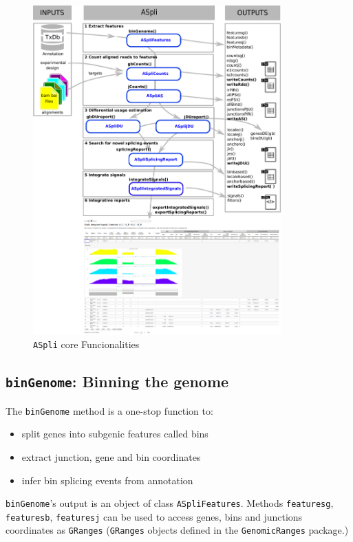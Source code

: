 \documentclass{article}
\begin{document}
\begin{figure}[ht!]
\centering
\includegraphics[width=0.85\textwidth]{images/fig1.pdf}
\caption{ \texttt{ASpli} core Funcionalities }
\label{fig:ASpliStructure}
\end{figure}

\subsection{\texttt{binGenome}: Binning the genome }
\label{sectionBinG}

The \texttt{binGenome} method is a one-stop function to:
\begin{itemize}
 \item split genes into subgenic features called bins
 \item extract junction, gene and bin coordinates
 \item infer bin splicing events from annotation 
\end{itemize}

\texttt{binGenome}'s output is an object of class \texttt{ASpliFeatures}. 
Methods \texttt{featuresg}, \texttt{featuresb}, \texttt{featuresj} can be used to access genes, bins and junctions coordinates as \texttt{GRanges} (\texttt{GRanges} objects defined in the \texttt{GenomicRanges} package.) 
\end{document}
